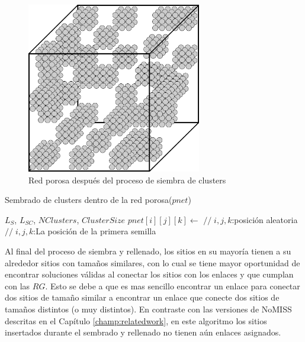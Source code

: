 \begin{figure}[h]
\centering
\includegraphics[width=3.0in]{img/cluster1.pdf}
\caption{Red porosa después del proceso de siembra de clusters}
\label{fig:cluster1}
\end{figure}

\begin{algorithm}
\caption{Sembrado de clusters dentro de la red porosa($pnet$)}\label{alg:seedingalg}
\begin{algorithmic}[1]
\Require $L_S$, $L_{SC}$, $NClusters$, $ClusterSize$ 
\State $pnet[i][j][k] \gets $  {$//\;i,j,k$:posición aleatoria}
\State {}
\EndFor
\EndFor
{} {$//\;i,j,k$:La posición de la primera semilla}
	\State {}
\EndWhile
\end{algorithmic}
\end{algorithm}

Al final del proceso de siembra y rellenado, los sitios en su mayoría tienen a su alrededor sitios con tamaños similares, con lo cual se 
tiene mayor oportunidad de encontrar soluciones válidas al conectar los sitios con los enlaces y que cumplan con las $RG$. Esto se debe a 
que es mas sencillo encontrar un enlace para conectar dos sitios de tamaño similar a encontrar un enlace que conecte dos sitios de tamaños 
distintos (o muy distintos). En contraste con las versiones de NoMISS descritas en el Capítulo \ref{champ:relatedwork}, en este algoritmo
los sitios insertados durante el sembrado y rellenado no tienen aún enlaces asignados.\\

